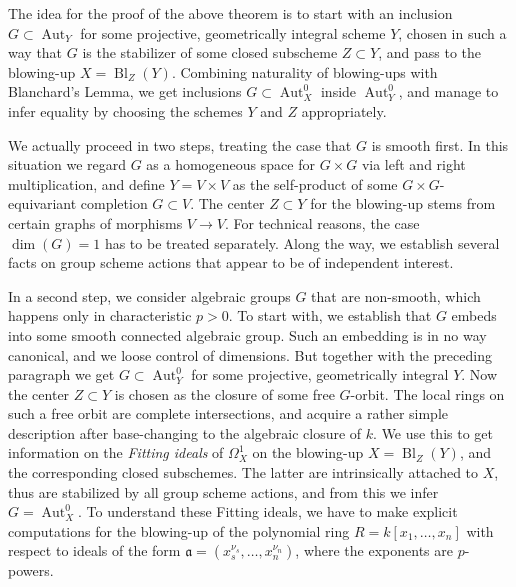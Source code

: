\documentclass[oneside, 12pt]{amsart}
\theoremstyle{definition}
\theoremstyle{remark}
\newcommand{\ideala}{\mathfrak{a}}
\newcommand{\Aut}{\operatorname{Aut}}
\newcommand{\Bl}{\operatorname{Bl}}
\newcommand{\ra}{\rightarrow}
\begin{document}
The idea for the proof of the above theorem  is to start with an inclusion $G\subset\Aut_Y$ 
for some  projective, geometrically integral scheme $Y$, chosen in such a way 
that $G$ is the stabilizer of some closed subscheme $Z\subset Y$, and     
pass to the blowing-up $X=\Bl_Z(Y)$. Combining naturality of blowing-ups 
with Blanchard's Lemma, we get inclusions $G\subset\Aut^0_X$ inside $\Aut^0_Y$,
and manage to infer equality by choosing the schemes $Y$ and $Z$  appropriately.
 
We actually proceed in two steps, treating the case that $G$ is smooth first. 
In this situation we regard $G$ as a homogeneous space for $G\times G$ 
via left and right multiplication, and define $Y=V\times V$  as the self-product
of some  $G \times G$-equivariant completion 
$G\subset V$. The center $Z\subset Y$ for the blowing-up 
stems from  certain graphs of morphisms $V\ra V$. 
For technical reasons, the case $\dim(G)=1$ has to be treated separately.
Along the way, we establish several facts on group scheme actions that appear to be of independent interest.

In a second step, we consider algebraic groups $G$ that are non-smooth, 
which happens only in characteristic $p>0$. 
To start with, we establish that $G$ embeds into some smooth connected 
algebraic group. Such an embedding is in no way canonical, and we loose 
control of dimensions. But together with the preceding paragraph we get  
$G\subset\Aut^0_Y$ for some projective, geometrically integral $Y$.   
Now the center $Z\subset Y$ is chosen as the  closure of some free $G$-orbit.
The local rings on such a free orbit are complete intersections, and acquire a rather simple description after base-changing to the algebraic closure of $k$.
We use this to get information on the \emph{Fitting ideals} of 
$\Omega^1_X$ on the blowing-up $X=\Bl_Z(Y)$, and the corresponding closed subschemes.
The latter are intrinsically attached to $X$, thus are stabilized by all group scheme actions,
and from  this we  infer $G=\Aut^0_X$. 
To understand these Fitting ideals, we have to make  explicit computations for  the blowing-up of the polynomial ring
$R=k[x_1,\ldots,x_n]$ with respect to ideals of the form $\ideala=(x_s^{\nu_s},\ldots,x_n^{\nu_n})$,
where the exponents are $p$-powers.  
 
\end{document}
